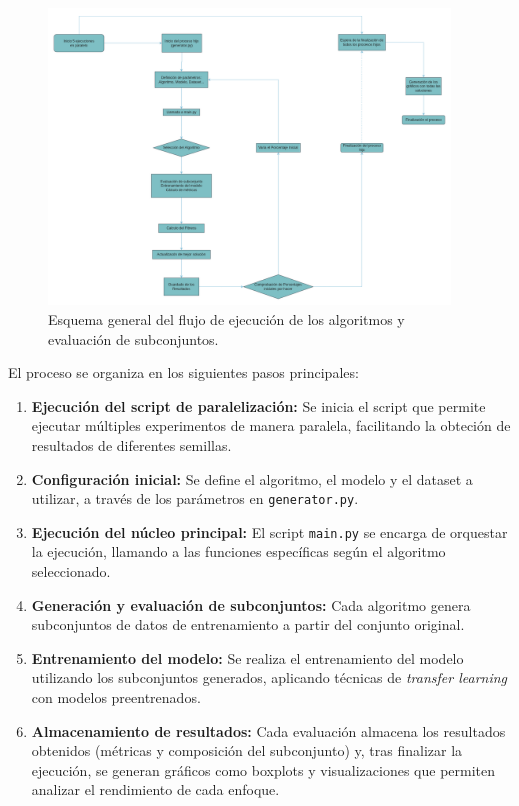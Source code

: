 \begin{figure}[htp]
      \centering
      \includegraphics[width=0.95\textwidth]{imagenes/flujo2.drawio}
      \caption{Esquema general del flujo de ejecución de los algoritmos y evaluación de subconjuntos.}
      \label{fig:esquema-flujo-algoritmos}
\end{figure}

El proceso se organiza en los siguientes pasos principales:

\begin{enumerate}
      \item \textbf{Ejecución del script de paralelización:} Se inicia el script que permite ejecutar múltiples experimentos de manera paralela,
            facilitando la obteción de resultados de diferentes semillas.
      \item \textbf{Configuración inicial:} Se define el algoritmo, el modelo y el dataset a utilizar, a través de los parámetros en \texttt{generator.py}.
      \item \textbf{Ejecución del núcleo principal:} El script \texttt{main.py} se encarga de orquestar la ejecución,
            llamando a las funciones específicas según el algoritmo seleccionado.
      \item \textbf{Generación y evaluación de subconjuntos:} Cada algoritmo genera subconjuntos de datos de entrenamiento a partir del conjunto original.
      \item \textbf{Entrenamiento del modelo:} Se realiza el entrenamiento del modelo utilizando los subconjuntos generados,
            aplicando técnicas de \textit{transfer learning} con modelos preentrenados.
      \item \textbf{Almacenamiento de resultados:} Cada evaluación almacena los resultados obtenidos (métricas y composición del subconjunto) y,
            tras finalizar la ejecución, se generan gráficos como boxplots y visualizaciones que permiten analizar el rendimiento de cada enfoque.
\end{enumerate}

